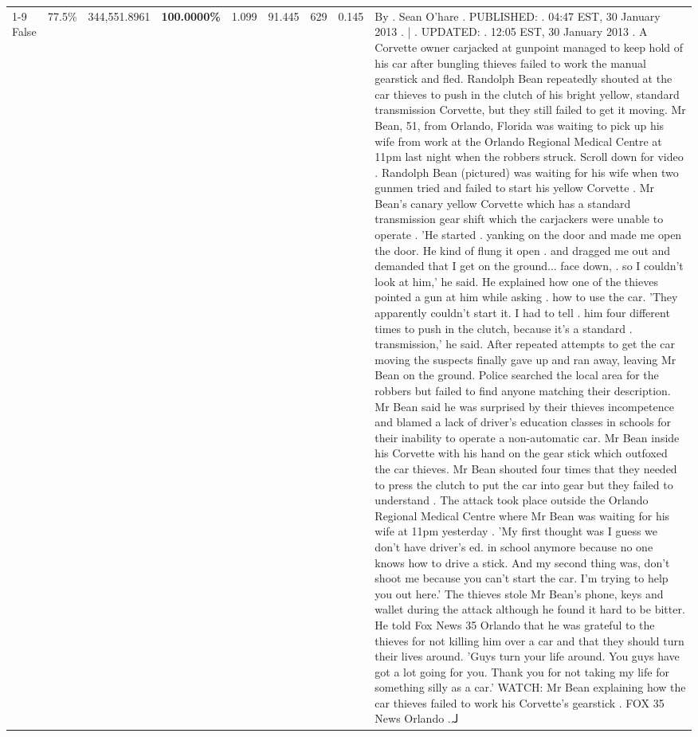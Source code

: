 \begin{table}[H]
\begin{tabular}{lllrlllll}
\cline{1-9} \cline{2-9}
False & 77.5\% & 344,551.8961 & \bfseries \color{red} 100.0000\% & 1.099 & 91.445 & 629 & 0.145 & By . Sean O'hare . PUBLISHED: . 04:47 EST, 30 January 2013 . | . UPDATED: . 12:05 EST, 30 January 2013 . A Corvette owner carjacked at gunpoint managed to keep hold of his car after bungling thieves failed to work the manual gearstick and fled. Randolph Bean repeatedly shouted at the car thieves to push in the clutch of his bright yellow, standard transmission Corvette, but they still failed to get it moving. Mr Bean, 51, from Orlando, Florida was waiting to pick up his wife from work at the Orlando Regional Medical Centre at 11pm last night when the robbers struck. Scroll down for video . Randolph Bean (pictured) was waiting for his wife when two gunmen tried and failed to start his yellow Corvette . Mr Bean's canary yellow Corvette which has a standard transmission gear shift which the carjackers were unable to operate . 'He started . yanking on the door and made me open the door. He kind of flung it open . and dragged me out and demanded that I get on the ground... face down, . so I couldn't look at him,' he said. He explained how one of the thieves pointed a gun at him while asking . how to use the car. 'They apparently couldn't start it. I had to tell . him four different times to push in the clutch, because it's a standard . transmission,' he said. After repeated attempts to get the car moving the suspects finally gave up and ran away, leaving Mr Bean on the ground. Police searched the local area for the robbers but failed to find anyone matching their description. Mr Bean said he was surprised by their thieves incompetence and blamed a lack of driver's education classes in schools for their inability to operate a non-automatic car. Mr Bean inside his Corvette with his hand on the gear stick which outfoxed the car thieves. Mr Bean shouted four times that they needed to press the clutch to put the car into gear but they failed to understand . The attack took place outside the Orlando Regional Medical Centre where Mr Bean was waiting for his wife at 11pm yesterday . 'My first thought was I guess we don't have driver's ed. in school anymore because no one knows how to drive a stick. And my second thing was, don't shoot me because you can't start the car. I'm trying to help you out here.' The thieves stole Mr Bean's phone, keys and wallet during the attack although he found it hard to be bitter. He told Fox News 35 Orlando that he was grateful to the thieves for not killing him over a car and that they should turn their lives around. 'Guys turn your life around. You guys have got a lot going for you. Thank you for not taking my life for something silly as a car.' WATCH: Mr Bean explaining how the car thieves failed to work his Corvette's gearstick . FOX 35 News Orlando .لہ \\

\end{tabular}
\end{table}
